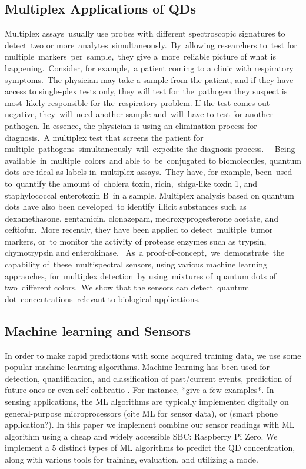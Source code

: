 \documentclass[journal,twoside,web]{ieeecolor}
\begin{document}
\subsection{Multiplex Applications of QDs}
Multiplex assays usually use probes with different spectroscopic signatures to detect two or more analytes simultaneously. By allowing researchers to test for multiple markers per sample, they give a more reliable picture of what is happening. Consider, for example, a patient coming to a clinic with respiratory symptoms. The physician may take a sample from the patient, and if they have access to single-plex tests only, they will test for the pathogen they suspect is most likely responsible for the respiratory problem. If the test comes out negative, they will need another sample and will have to test for another pathogen. In essence, the physician is using an elimination process for diagnosis. A multiplex test that screens the patient for multiple pathogens simultaneously will expedite the diagnosis process.  
Being available in multiple colors and able to be conjugated to biomolecules, quantum dots are ideal as labels in multiplex assays. They have, for example, been used to quantify the amount of cholera toxin, ricin, shiga-like toxin 1, and staphylococcal enterotoxin B in a sample. Multiplex analysis based on quantum dots have also been developed to identify illicit substances such as dexamethasone, gentamicin, clonazepam, medroxyprogesterone acetate, and ceftiofur. More recently, they have been applied to detect multiple tumor markers, or to monitor the activity of protease enzymes such as trypsin, chymotrypsin and enterokinase.
 As a proof-of-concept, we demonstrate the capability of these multispectral sensors, using various machine learning appraoches, for multiplex detection by using mixtures of quantum dots of two different colors. We show that the sensors can detect quantum dot concentrations relevant to biological applications.  

\subsection{Machine learning and Sensors}

In order to make rapid predictions with some acquired training data, we use some popular machine learning algorithms. Machine learning has been used for  detection, quantification, and classification of past/current events, prediction of future ones or even self-calibratio \cite{Cho2014} . For instance, *give a few examples*. In sensing applications, the ML algorithms are typically implemented digitally on general-purpose microprocessors (cite ML for sensor data), or (smart phone application?). In this paper we implement combine our sensor readings with ML algorithm using a cheap and widely accessible SBC: Raspberry Pi Zero. We implement a 5 distinct types of ML algorithms to predict the QD concentration, along with various tools for training, evaluation, and utilizing a mode. 
\\
\end{document}
